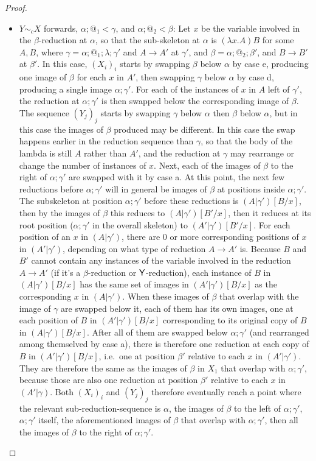 \begin{proof}
\begin{itemize}
\item $Y \sim_c X$ forwards, $\alpha;@_1 < \gamma$, and $\alpha;@_2 < \beta$: Let $x$ be the variable involved in the $\beta$-reduction at $\alpha$, so that the sub-skeleton at $\alpha$ is $(\lambda x. A) B$ for some $A, B$, where $\gamma = \alpha;@_1;\lambda;\gamma'$ and $A \to A'$ at $\gamma'$, and $\beta = \alpha;@_2;\beta'$, and $B \to B'$ at $\beta'$. In this case, $(X_i)_i$ starts by swapping $\beta$ below $\alpha$ by case e, producing one image of $\beta$ for each $x$ in $A'$, then swapping $\gamma$ below $\alpha$ by case d, producing a single image $\alpha;\gamma'$. For each of the instances of $x$ in $A$ left of $\gamma'$, the reduction at $\alpha;\gamma'$ is then swapped below the corresponding image of $\beta$. The sequence $(Y_j)_j$ starts by swapping $\gamma$ below $\alpha$ then $\beta$ below $\alpha$, but in this case the images of $\beta$ produced may be different. In this case the swap happens earlier in the reduction sequence than $\gamma$, so that the body of the lambda is still $A$ rather than $A'$, and the reduction at $\gamma$ may rearrange or change the number of instances of $x$. Next, each of the images of $\beta$ to the right of $\alpha;\gamma'$ are swapped with it by case a. At this point, the next few reductions before $\alpha;\gamma'$ will in general be images of $\beta$ at positions inside $\alpha;\gamma'$. The subskeleton at position $\alpha;\gamma'$ before these reductions is $(A|\gamma')[B/x]$, then by the images of $\beta$ this reduces to $(A|\gamma')[B'/x]$, then it reduces at its root position ($\alpha;\gamma'$ in the overall skeleton) to $(A'|\gamma')[B'/x]$. For each position of an $x$ in $(A|\gamma')$, there are 0 or more corresponding positions of $x$ in $(A'|\gamma')$, depending on what type of reduction $A \to A'$ is. Because $B$ and $B'$ cannot contain any instances of the variable involved in the reduction $A \to A'$ (if it's a $\beta$-reduction or $\mathsf{Y}$-reduction), each instance of $B$ in $(A|\gamma')[B/x]$ has the same set of images in $(A'|\gamma')[B/x]$ as the corresponding $x$ in $(A|\gamma')$. When these images of $\beta$ that overlap with the image of $\gamma$ are swapped below it, each of them has its own images, one at each position of $B$ in $(A'|\gamma')[B/x]$ corresponding to its original copy of $B$ in $(A|\gamma')[B/x]$. After all of them are swapped below $\alpha;\gamma'$ (and rearranged among themselved by case a), there is therefore one reduction at each copy of $B$ in $(A'|\gamma')[B/x]$, i.e.~one at position $\beta'$ relative to each $x$ in $(A'|\gamma')$. They are therefore the same as the images of $\beta$ in $X_1$ that overlap with $\alpha;\gamma'$, because those are also one reduction at position $\beta'$ relative to each $x$ in $(A'|\gamma)$. Both $(X_i)_i$ and $(Y_j)_j$ therefore eventually reach a point where the relevant sub-reduction-sequence is $\alpha$, the images of $\beta$ to the left of $\alpha;\gamma'$, $\alpha;\gamma'$ itself, the aforementioned images of $\beta$ that overlap with $\alpha;\gamma'$, then all the images of $\beta$ to the right of $\alpha;\gamma'$.

\end{itemize}
\end{proof}
